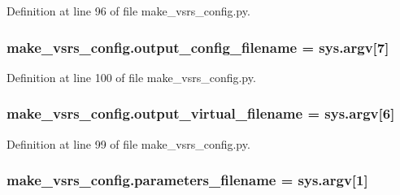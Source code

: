 Definition at line 96 of file make\+\_\+vsrs\+\_\+config.\+py.

\subsubsection[{\texorpdfstring{output\+\_\+config\+\_\+filename}{output_config_filename}}]{\setlength{\rightskip}{0pt plus 5cm}make\+\_\+vsrs\+\_\+config.\+output\+\_\+config\+\_\+filename = sys.\+argv\mbox{[}7\mbox{]}}\hypertarget{namespacemake__vsrs__config_a10d226e35ee3d383ddb4e32445182d57}{}\label{namespacemake__vsrs__config_a10d226e35ee3d383ddb4e32445182d57}


Definition at line 100 of file make\+\_\+vsrs\+\_\+config.\+py.

\subsubsection[{\texorpdfstring{output\+\_\+virtual\+\_\+filename}{output_virtual_filename}}]{\setlength{\rightskip}{0pt plus 5cm}make\+\_\+vsrs\+\_\+config.\+output\+\_\+virtual\+\_\+filename = sys.\+argv\mbox{[}6\mbox{]}}\hypertarget{namespacemake__vsrs__config_aa243e869e206ff385f9a78dfdf4e2455}{}\label{namespacemake__vsrs__config_aa243e869e206ff385f9a78dfdf4e2455}


Definition at line 99 of file make\+\_\+vsrs\+\_\+config.\+py.

\subsubsection[{\texorpdfstring{parameters\+\_\+filename}{parameters_filename}}]{\setlength{\rightskip}{0pt plus 5cm}make\+\_\+vsrs\+\_\+config.\+parameters\+\_\+filename = sys.\+argv\mbox{[}1\mbox{]}}\hypertarget{namespacemake__vsrs__config_a8b581ca7889ba91fa3833ddd8350e531}{}\label{namespacemake__vsrs__config_a8b581ca7889ba91fa3833ddd8350e531}



